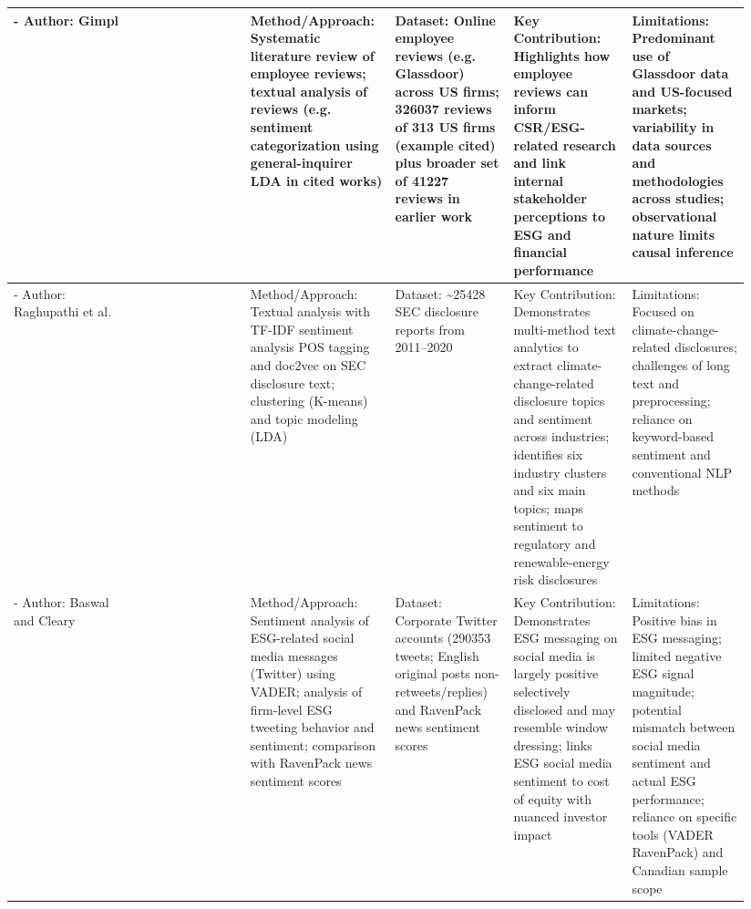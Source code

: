 \documentclass{article}
\begin{document}
\begin{landscape}
\begin{longtable}{p{0.157\linewidth} p{0.157\linewidth} p{0.157\linewidth} p{0.157\linewidth} p{0.157\linewidth} p{0.157\linewidth}}
- Author: Gimpl & ~ & Method/Approach: Systematic literature review of employee reviews; textual analysis of reviews (e.g. sentiment categorization using general-inquirer LDA in cited works) & Dataset: Online employee reviews (e.g. Glassdoor) across US firms; 326037 reviews of 313 US firms (example cited) plus broader set of 41227 reviews in earlier work & Key Contribution: Highlights how employee reviews can inform CSR/ESG-related research and link internal stakeholder perceptions to ESG and financial performance & Limitations: Predominant use of Glassdoor data and US-focused markets; variability in data sources and methodologies across studies; observational nature limits causal inference \\ \hline
- Author: Raghupathi et al. & ~ & Method/Approach: Textual analysis with TF-IDF sentiment analysis POS tagging and doc2vec on SEC disclosure text; clustering (K-means) and topic modeling (LDA) & Dataset: \textasciitilde{}25428 SEC disclosure reports from 2011–2020 & Key Contribution: Demonstrates multi-method text analytics to extract climate-change-related disclosure topics and sentiment across industries; identifies six industry clusters and six main topics; maps sentiment to regulatory and renewable-energy risk disclosures & Limitations: Focused on climate-change-related disclosures; challenges of long text and preprocessing; reliance on keyword-based sentiment and conventional NLP methods \\ \hline
- Author: Baswal and Cleary & ~ & Method/Approach: Sentiment analysis of ESG-related social media messages (Twitter) using VADER; analysis of firm-level ESG tweeting behavior and sentiment; comparison with RavenPack news sentiment scores & Dataset: Corporate Twitter accounts (290353 tweets; English original posts non-retweets/replies) and RavenPack news sentiment scores & Key Contribution: Demonstrates ESG messaging on social media is largely positive selectively disclosed and may resemble window dressing; links ESG social media sentiment to cost of equity with nuanced investor impact & Limitations: Positive bias in ESG messaging; limited negative ESG signal magnitude; potential mismatch between social media sentiment and actual ESG performance; reliance on specific tools (VADER RavenPack) and Canadian sample scope \\ \hline

\end{longtable}
\end{landscape}
\end{document}
